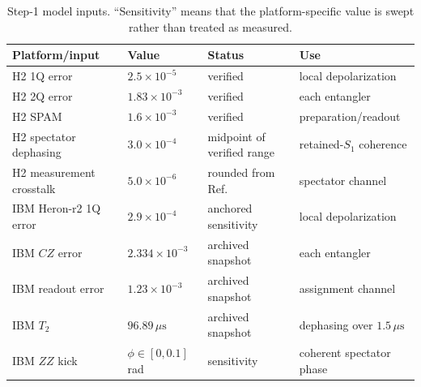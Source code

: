 \documentclass[aps,prl,onecolumn,superscriptaddress,nofootinbib]{revtex4-2}
\begin{document}
\begin{table}[t]
\caption{Step-1 model inputs.  ``Sensitivity'' means that the platform-specific value is swept rather than treated as measured.}
\label{tab:noise-provenance}
\begin{tabular}{@{}llll@{}}
\toprule
\parbox[t]{0.23\linewidth}{Platform/input} &
\parbox[t]{0.17\linewidth}{Value} &
\parbox[t]{0.20\linewidth}{Status} &
\parbox[t]{0.29\linewidth}{Use}\\
\midrule
\parbox[t]{0.23\linewidth}{H2 1Q error} & \parbox[t]{0.17\linewidth}{$2.5\times10^{-5}$} & \parbox[t]{0.20\linewidth}{verified~\cite{Moses2023Racetrack}} & \parbox[t]{0.29\linewidth}{local depolarization}\\
\parbox[t]{0.23\linewidth}{H2 2Q error} & \parbox[t]{0.17\linewidth}{$1.83\times10^{-3}$} & \parbox[t]{0.20\linewidth}{verified~\cite{Moses2023Racetrack}} & \parbox[t]{0.29\linewidth}{each entangler}\\
\parbox[t]{0.23\linewidth}{H2 SPAM} & \parbox[t]{0.17\linewidth}{$1.6\times10^{-3}$} & \parbox[t]{0.20\linewidth}{verified~\cite{Moses2023Racetrack}} & \parbox[t]{0.29\linewidth}{preparation/readout}\\
\parbox[t]{0.23\linewidth}{H2 spectator dephasing} & \parbox[t]{0.17\linewidth}{$3.0\times10^{-4}$} & \parbox[t]{0.20\linewidth}{midpoint of verified range} & \parbox[t]{0.29\linewidth}{retained-$S_1$ coherence}\\
\parbox[t]{0.23\linewidth}{H2 measurement crosstalk} & \parbox[t]{0.17\linewidth}{$5.0\times10^{-6}$} & \parbox[t]{0.20\linewidth}{rounded from Ref.~\cite{Moses2023Racetrack}} & \parbox[t]{0.29\linewidth}{spectator channel}\\
\parbox[t]{0.23\linewidth}{IBM Heron-r2 1Q error} & \parbox[t]{0.17\linewidth}{$2.9\times10^{-4}$} & \parbox[t]{0.20\linewidth}{anchored sensitivity} & \parbox[t]{0.29\linewidth}{local depolarization}\\
\parbox[t]{0.23\linewidth}{IBM $CZ$ error} & \parbox[t]{0.17\linewidth}{$2.334\times10^{-3}$} & \parbox[t]{0.20\linewidth}{archived snapshot~\cite{Polche2026KQRC,IBMBackendDetails2026}} & \parbox[t]{0.29\linewidth}{each entangler}\\
\parbox[t]{0.23\linewidth}{IBM readout error} & \parbox[t]{0.17\linewidth}{$1.23\times10^{-3}$} & \parbox[t]{0.20\linewidth}{archived snapshot~\cite{Polche2026KQRC,IBMBackendDetails2026}} & \parbox[t]{0.29\linewidth}{assignment channel}\\
\parbox[t]{0.23\linewidth}{IBM $T_2$} & \parbox[t]{0.17\linewidth}{$96.89\,\mu\mathrm{s}$} & \parbox[t]{0.20\linewidth}{archived snapshot~\cite{Polche2026KQRC,IBMBackendDetails2026}} & \parbox[t]{0.29\linewidth}{dephasing over $1.5\,\mu\mathrm{s}$}\\
\parbox[t]{0.23\linewidth}{IBM $ZZ$ kick} & \parbox[t]{0.17\linewidth}{$\phi\in[0,0.1]$ rad} & \parbox[t]{0.20\linewidth}{sensitivity} & \parbox[t]{0.29\linewidth}{coherent spectator phase}\\
\bottomrule
\end{tabular}
\end{table}
\end{document}
